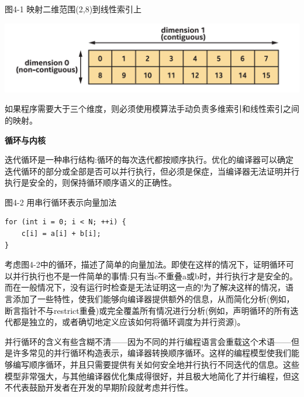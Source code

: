 \hspace*{\fill} \par %
图4-1 映射二维范围(2,8)到线性索引上
\begin{center}
	\includegraphics[width=1.\textwidth]{content/chapter-4/images/2}
\end{center}

如果程序需要大于三个维度，则必须使用模算法手动负责多维索引和线性索引之间的映射。\par

\hspace*{\fill} \par %
\textbf{循环与内核}

迭代循环是一种串行结构:循环的每次迭代都按顺序执行。优化的编译器可以确定迭代循环的部分或全部是否可以并行执行，但必须是保症，当编译器无法证明并行执行是安全的，则保持循环顺序语义的正确性。\par

\hspace*{\fill} \par %
图4-2 用串行循环表示向量加法
\begin{lstlisting}[caption={}]
for (int i = 0; i < N; ++i) {
	c[i] = a[i] + b[i];
}
\end{lstlisting}

考虑图4-2中的循环，描述了简单的向量加法。即使在这样的情况下，证明循环可以并行执行也不是一件简单的事情:只有当c不重叠a或b时，并行执行才是安全的。而在一般情况下，没有运行时检查是无法证明这一点的!为了解决这样的情况，语言添加了一些特性，使我们能够向编译器提供额外的信息，从而简化分析(例如，断言指针不与restrict重叠)或完全覆盖所有情况进行分析(例如，声明循环的所有迭代都是独立的，或者确切地定义应该如何将循环调度为并行资源)。\par

并行循环的含义有些含糊不清——因为不同的并行编程语言会重载这个术语——但是许多常见的并行循环构造表示，编译器转换顺序循环。这样的编程模型使我们能够编写顺序循环，并且只需要提供有关如何安全地并行执行不同迭代的信息。这些模型非常强大，与其他编译器优化集成得很好，并且极大地简化了并行编程，但这不代表鼓励开发者在开发的早期阶段就考虑并行性。\par

